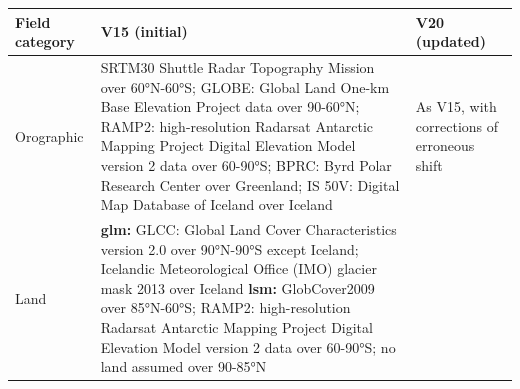 \documentclass[hess, twostagejnl]{copernicus}
\begin{document}
\begin{table}
	\begin{tabularx}{\textwidth}{lXX}
		\toprule 
		Field category & V15 (initial) & V20 (updated) \\
		\hline
		Orographic & SRTM30 Shuttle Radar Topography Mission over 60°N-60°S; GLOBE: Global Land One-km Base Elevation Project data over 90-60°N; RAMP2: high-resolution Radarsat Antarctic Mapping Project Digital Elevation Model version 2 data \citep{Liu2015} over 60-90°S; BPRC: Byrd Polar Research Center over Greenland; IS 50V: Digital Map Database of Iceland over Iceland & As V15, with corrections of erroneous shift
		\\
		\hline 
			Land &	\textbf{glm:} GLCC: Global Land Cover Characteristics version 2.0 over 90°N-90°S except Iceland; Icelandic Meteorological Office (IMO) glacier mask 2013 over Iceland \newline 
		\textbf{lsm:} GlobCover2009 \citep{GLOBCOVER,arino2012glcm} over 85°N-60°S; RAMP2: high-resolution Radarsat Antarctic Mapping Project Digital Elevation Model version 2 data \citep{Liu2015} over 60-90°S; no land assumed over 90-85°N   


\end{tabularx}
\end{table}
\end{document}
